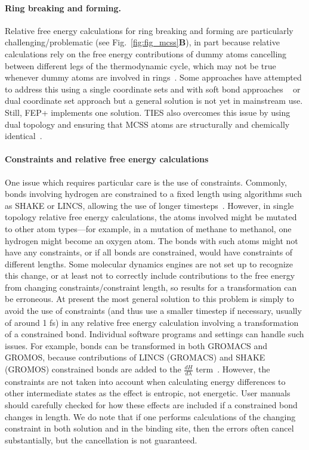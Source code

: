 \documentclass[9pt,bestpractices]{livecoms}
\begin{document}
\paragraph{Ring breaking and forming.} Relative free energy calculations for ring breaking and forming are particularly challenging/problematic (see Fig.~\ref{fig:fig_mcss}\textbf{B}), in part because relative calculations rely on the free energy contributions of dummy atoms cancelling between different legs of the thermodynamic cycle, which may not be true whenever dummy atoms are involved in rings~\cite{liu2015ring}.
Some approaches have attempted to address this using a single coordinate sets and with soft bond approaches ~\cite{clark2019relative,wang2017accurate} or dual coordinate set approach \cite{jespers2019qligfep, ries2022relative} but a general solution is not yet in mainstream use. Still, FEP+ implements one solution\cite{wang2017accurate}.
TIES also overcomes this issue by using dual topology and ensuring that MCSS atoms are structurally and chemically identical~\cite{bhati2017, bieniek2021}.

\paragraph{Constraints and relative free energy calculations}
One issue which requires particular care is the use of constraints.
Commonly, bonds involving hydrogen are constrained to a fixed length using algorithms such as SHAKE or LINCS, allowing the use of longer timesteps~\cite{krautler2001fast}.
However, in single topology relative free energy calculations, the atoms involved might be mutated to other atom types---for example, in a mutation of methane to methanol, one hydrogen might become an oxygen atom. The bonds with such atoms might not have any constraints, or if all bonds are constrained, would have constraints of different lengths. 
Some molecular dynamics engines are not set up to recognize this change, or at least not to correctly include contributions to the free energy from changing constraints/constraint length, so results for a transformation can be erroneous.
At present the most general solution to this problem is simply to avoid the use of constraints (and thus use a smaller timestep if necessary, usually of around 1 fs) in any relative free energy calculation involving a transformation of a constrained bond. Individual software programs and settings can handle such issues. For example, bonds can be transformed in both GROMACS and GROMOS, because contributions of LINCS (GROMACS) and SHAKE (GROMOS) constrained bonds are added to the $\frac{dH}{d\lambda}$ term~\cite{pearlman1993determining, straatsma1992holonomic, pearlman1991overlooked, gunsteren1989computer}. However, the constraints are not taken into account when calculating energy differences to other intermediate states as the effect is entropic, not energetic. User manuals should carefully checked for how these effects are included if a constrained bond changes in length. We do note that if one performs calculations of the changing constraint in both solution and in the binding site, then the errors often cancel substantially, but the cancellation is not guaranteed.
\end{document}
